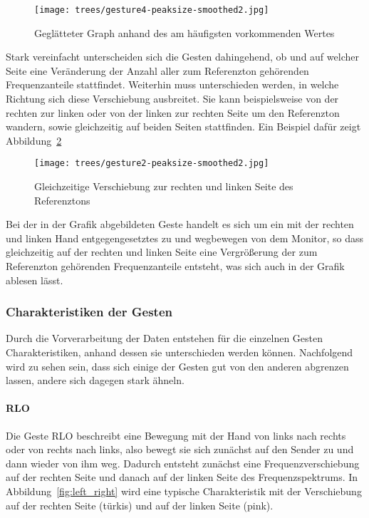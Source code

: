\begin{figure}[htbp] \centering
\texttt{[image: trees/gesture4-peaksize-smoothed2.jpg]}
\caption{Geglätteter Graph anhand des am häufigsten vorkommenden Wertes}
\label{fig:frequent_value}
\end{figure}


Stark vereinfacht unterscheiden sich die Gesten dahingehend, ob und auf welcher Seite 
eine Veränderung der Anzahl aller zum Referenzton gehörenden Frequenzanteile stattfindet. 
Weiterhin muss unterschieden werden, in welche Richtung sich diese Verschiebung ausbreitet. 
Sie kann beispielsweise von der rechten zur linken oder von der linken zur rechten Seite 
um den Referenzton wandern, sowie gleichzeitig auf beiden Seiten stattfinden. 
Ein Beispiel dafür zeigt Abbildung~\ref{fig:left_right_same_time}

\begin{figure}[htbp] \centering
\texttt{[image: trees/gesture2-peaksize-smoothed2.jpg]}
\caption{Gleichzeitige Verschiebung zur rechten und linken Seite des Referenztons}
\label{fig:left_right_same_time}
\end{figure}

Bei der in der Grafik abgebildeten Geste handelt es sich um ein mit der rechten und linken Hand entgegengesetztes zu und 
wegbewegen von dem Monitor, so dass gleichzeitig auf der rechten und linken Seite eine Vergrößerung der 
zum Referenzton gehörenden Frequenzanteile entsteht, was sich auch in der Grafik ablesen lässt.

\subsubsection{Charakteristiken der Gesten} \label{charakteristiken}
Durch die Vorverarbeitung der Daten entstehen für die einzelnen Gesten Charakteristiken, anhand dessen sie unterschieden werden können. Nachfolgend wird zu sehen sein, dass sich einige der Gesten gut von den anderen abgrenzen lassen, andere sich dagegen stark ähneln.

\paragraph*{\acl{RLO}}
Die Geste \acl{RLO} beschreibt eine Bewegung mit der Hand von links nach rechts oder von rechts nach links, also bewegt sie sich zunächst auf den Sender zu und dann wieder von ihm weg. Dadurch entsteht zunächst eine Frequenzverschiebung auf der rechten Seite und danach auf der linken Seite des Frequenzspektrums. In Abbildung~\ref{fig:left_right} wird eine typische Charakteristik mit der Verschiebung auf der rechten Seite (türkis) und auf der linken Seite (pink).

